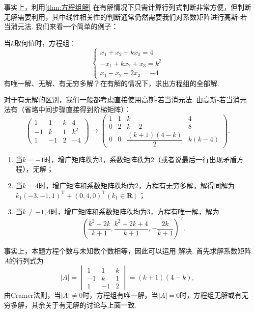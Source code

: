 事实上，利用\autoref{thm:方程组解} 在有解情况下只需计算行列式判断非常方便，但判断无解需要利用，其中线性相关性的判断通常仍然需要我们对系数矩阵进行高斯-若当消元法. 我们来看一个简单的例子：
\begin{example}{}{}
    当$k$取何值时，方程组：
    \[\begin{cases}
            x_1+x_2+kx_3=4 \\ -x_1+kx_2+x_3=k^2 \\ x_1-x_2+2x_3=-4
        \end{cases}\]
    有唯一解、无解、有无穷多解？在有解的情况下，求出方程组的全部解.
\end{example}
\begin{solution}
    对于有无解的区别，我们一般都考虑直接使用高斯-若当消元法. 由高斯-若当消元法有（省略中间步骤直接得到阶梯矩阵）：
    \[\begin{pmatrix}
            1  & 1  & k & 4   \\
            -1 & k  & 1 & k^2 \\
            1  & -1 & 2 & -4
        \end{pmatrix}\to\begin{pmatrix}
            1 & 1 & k                     & 4      \\
            0 & 2 & k-2                   & 8      \\
            0 & 0 & \dfrac{(k+1)(4-k)}{2} & k(k-4)
        \end{pmatrix}.\]
    \begin{enumerate}
        \item 当$k=-1$时，增广矩阵秩为3，系数矩阵秩为2（或者说最后一行出现矛盾方程），无解；

        \item 当$k=4$时，增广矩阵和系数矩阵秩均为2，方程有无穷多解，解得同解为$k_1(-3,-1,1)^{\mathrm{T}}+(0,4,0)^{\mathrm{T}}(k_1\in\mathbf{R})$；

        \item 当$k\neq-1,4$时，增广矩阵和系数矩阵秩均为3，方程有唯一解，解为
              \[(\dfrac{k^2+2k}{k+1},\dfrac{k^2+2k+4}{k+1},-\dfrac{2k}{k+1})^{\mathrm{T}}.\]
    \end{enumerate}

    事实上，本题方程个数与未知数个数相等，因此可以运用 解决. 首先求解系数矩阵$A$的行列式为
    \[|A|=\begin{vmatrix}
            1  & 1  & k \\
            -1 & k  & 1 \\
            1  & -1 & 2
        \end{vmatrix}=(k+1)(4-k),\]
    由Cramer法则，当$|A|\neq 0$时，方程组有唯一解，当$|A|=0$时，方程组无解或有无穷多解，其余关于有无解的讨论与上面一致.
\end{solution}

